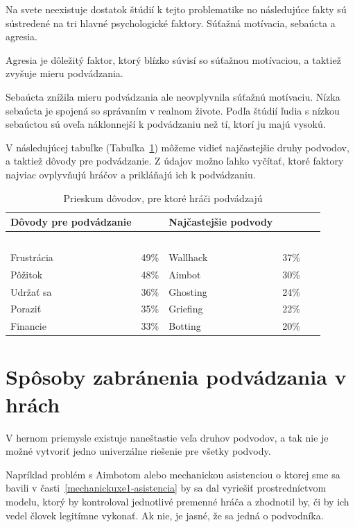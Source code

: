 \documentclass[10pt,twoside,slovak,a4paper]{article}
\begin{document}
Na svete neexistuje dostatok štúdií k tejto problematike no následujúce fakty sú sústredené na tri hlavné psychologické faktory. Súťažná motívacia, sebaúcta a agresia.

Agresia je dôležitý faktor, ktorý blízko súvisí so súťažnou motívaciou, a taktiež zvyšuje mieru podvádzania.

Sebaúcta znížila mieru podvádzania ale neovplyvnila súťažnú motívaciu. Nízka sebaúcta je spojená so správaním v realnom živote. Podľa štúdií ľudia s nízkou sebaúctou sú oveľa náklonnejší k podvádzaniu než tí, ktorí ju majú vysokú.\cite{pries}

V následujúcej tabuľke (Tabuľka~\ref{fig:mesh2}) môžeme vidieť najčastejšie druhy podvodov, a taktiež dôvody pre podvádzanie. Z údajov možno ľahko vyčítať, ktoré faktory najviac ovplyvňujú hráčov a prikláňajú ich k podvádzaniu.


\begin{table}[!ht]
    \centering
    \begin{tabular}{|l|l|l|l|l|}
    \hline
        Dôvody pre podvádzanie & ~ & Najčastejšie podvody & ~ & ~ \\ \hline
        ~ & ~ & ~ & ~ & ~ \\ \hline
        Frustrácia & 49\% & Wallhack & 37\% & ~ \\ \hline
        Pôžitok & 48\% & Aimbot & 30\% & ~ \\ \hline
        Udržať sa & 36\% & Ghosting & 24\% & ~ \\ \hline
        Poraziť & 35\% & Griefing & 22\% & ~ \\ \hline
        Financie & 33\% & Botting & 20\% & ~ \\ \hline
    \end{tabular}
    \caption{Prieskum dôvodov, pre ktoré hráči podvádzajú}
    \label{fig:mesh2}
\end{table}

\section{\texorpdfstring{Spôsoby zabránenia podvádzania v hrách
}{Spôsoby zabránenia podvádzania v hrách}\label{sposoby}}

V hernom priemysle existuje naneštastie veľa druhov podvodov, a tak nie je možné vytvoriť jedno univerzálne riešenie pre všetky podvody. 

Napríklad problém s Aimbotom alebo mechanickou asistenciou o ktorej sme sa bavili v časti~\ref{mechanickuxe1-asistencia} by sa dal vyriešiť prostredníctvom modelu, ktorý by kontroloval jednotlivé premenné hráča a zhodnotil by, či by ich vedel človek legitímne vykonať. Ak nie, je jasné, že sa jedná o podvodníka.
\end{document}
